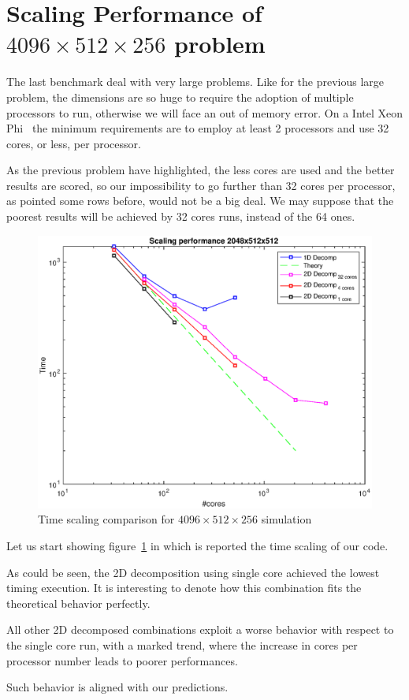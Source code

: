 \section{Scaling Performance of $4096\times512\times256$ problem}
The last benchmark deal with very large problems. Like for the previous large problem, the dimensions are so huge to require the adoption of multiple processors to run, otherwise we will face an out of memory error.
On a Intel Xeon Phi~\cite{intel:xeonphi} the minimum requirements are to employ at least 2 processors and use 32 cores, or less, per processor.
\par
As the previous problem have highlighted, the less cores are used and the better results are scored, so our impossibility to go further than 32 cores per processor, as pointed some rows before, would not be a big deal. We may suppose that the poorest results will be achieved by 32 cores runs, instead of the 64 ones. \\
\par

\begin{figure}
\begin{center}
\includegraphics[scale=0.6]{grafici/20481}
\caption{Time scaling comparison for $4096\times 512\times 256$ simulation}
\label{20481}
\end{center} 
\end{figure}

Let us start showing figure~\ref{20481} in which is reported the time scaling of our code.\par
As could be seen, the 2D decomposition using single core achieved the lowest timing execution.
It is interesting to denote how this combination fits the theoretical behavior perfectly.\par
All other 2D decomposed combinations exploit a worse behavior with respect to the single core run, with a marked trend, where the increase in cores per processor number leads to poorer performances. \par 
Such behavior is aligned with our predictions.\\

